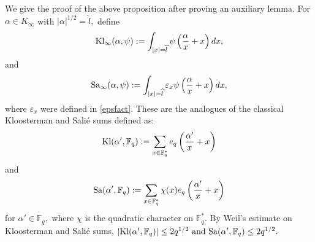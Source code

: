 \documentclass[10pt]{amsart}
\theoremstyle{plain}
\theoremstyle{plain}
\theoremstyle{remark}
\theoremstyle{definition}
\newcommand{\hl}{\widehat l}
\newcommand{\Kl}{\textup{Kl}}
\newcommand{\Sa}{\textup{Sa}}
\newcommand{\FF}{\mathbb{F}}
\begin{document}
We give the proof of the above proposition after proving an auxiliary lemma. For $\alpha \in K_{\infty}$ with $|\alpha|^{1/2}={\hl},$ define 
\[
\Kl_{\infty}(\alpha,\psi):=\int_{|x|=\hl} \psi\left(\frac{\alpha}{ x}+x\right) dx,
\]
and 
\[
\Sa_{\infty}(\alpha,\psi):=\int_{|x|=\hl} \varepsilon_{x} \psi\left(\frac{\alpha}{ x}+x\right) dx,
\]
where $\varepsilon_x$ were defined in \eqref{epsfact}.  These are the analogues of the classical Kloosterman and Sali\'e sums defined as:
\[
\Kl(\alpha^{\prime},\FF_q):= \sum_{x\in \FF_q^* }  e_q\left(\frac{\alpha'}{ x}+x\right)
\]
and 
\[
\Sa(\alpha^{\prime},\FF_q):=  \sum_{x\in \FF_q^* } \chi(x) e_q\left(\frac{\alpha'}{ x}+x\right)
\]
for $\alpha'\in \FF_q,$ where $\chi$ is the quadratic character on $\FF^*_q$. By Weil's estimate on Kloosterman and Sali\'e sums, 
 \(
|\Kl(\alpha^{\prime},\FF_q)| \leq 2q^{1/2} \text { and } \Sa(\alpha^{\prime},\FF_q)  \leq 2q^{1/2}.
 \)  
\end{document}
